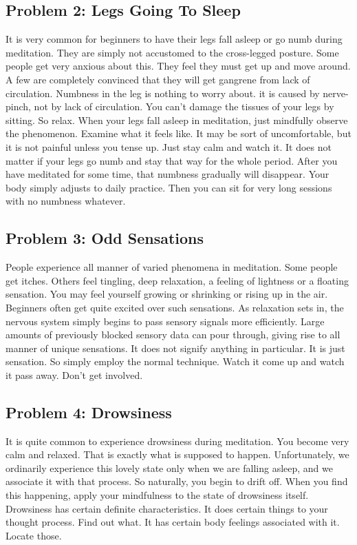 \subsection*{Problem 2: Legs Going To Sleep}
 It is very common for beginners to have their legs
fall asleep or go numb during meditation. They are simply not accustomed to the
cross-legged posture. Some people get very anxious about this. They feel they
must get up and move around. A few are completely convinced that they will get
gangrene from lack of circulation. Numbness in the leg is nothing to worry
about. it is caused by nerve-pinch, not by lack of circulation. You can't damage
the tissues of your legs by sitting. So relax. When your legs fall asleep in
meditation, just mindfully observe the phenomenon. Examine what it feels like.
It may be sort of uncomfortable, but it is not painful unless you tense up. Just
stay calm and watch it. It does not matter if your legs go numb and stay that
way for the whole period. After you have meditated for some time, that numbness
gradually will disappear. Your body simply adjusts to daily practice. Then you
can sit for very long sessions with no numbness whatever.

\subsection*{Problem 3: Odd Sensations }
People experience all manner of varied phenomena in
meditation. Some people get itches. Others feel tingling, deep relaxation, a
feeling of lightness or a floating sensation. You may feel yourself growing or
shrinking or rising up in the air. Beginners often get quite excited over such
sensations. As relaxation sets in, the nervous system simply begins to pass
sensory signals more efficiently. Large amounts of previously blocked sensory
data can pour through, giving rise to all manner of unique sensations. It does
not signify anything in particular. It is just sensation. So simply employ the
normal technique. Watch it come up and watch it pass away. Don't get involved.

\subsection*{Problem 4: Drowsiness} It is quite common to experience drowsiness during
meditation. You become very calm and relaxed. That is exactly what is supposed
to happen. Unfortunately, we ordinarily experience this lovely state only when
we are falling asleep, and we associate it with that process. So naturally, you
begin to drift off. When you find this happening, apply your mindfulness to the
state of drowsiness itself. Drowsiness has certain definite characteristics. It
does certain things to your thought process. Find out what. It has certain body
feelings associated with it. Locate those.

